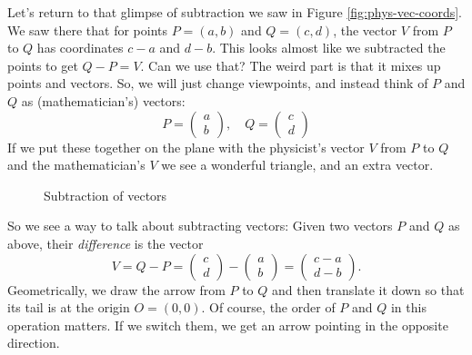 \documentclass[00-livre-main.tex]{subfiles}
\begin{document}
Let's return to that glimpse of subtraction we saw in Figure \ref{fig:phys-vec-coords}.
We saw there that for points $P = (a,b)$ and $Q = (c,d)$, the vector $V$ from $P$ to $Q$ has coordinates $c-a$ and $d-b$. 
This looks almost like we subtracted the points to get $Q-P = V$. 
Can we use that? 
The weird part is that it mixes up points and vectors. 
So, we will just change viewpoints, and instead think of $P$ and $Q$ as (mathematician's) vectors:
\[
P = \begin{pmatrix} a \\ b \end{pmatrix}, \quad Q = \begin{pmatrix} c \\ d \end{pmatrix}
\]
If we put these together on the plane with the physicist's vector $V$ from $P$ to $Q$ and the mathematician's $V$ we see a wonderful triangle, and an extra vector.
\begin{figure}[h]
\centering
{}
\caption{Subtraction of vectors}
\label{fig:subtract-vec}
\end{figure}
So we see a way to talk about subtracting vectors: Given two vectors $P$ and $Q$ as above, their
\emph{difference} is the vector
\[
V = Q-P = \begin{pmatrix} c \\ d \end{pmatrix} - \begin{pmatrix} a \\ b \end{pmatrix} = \begin{pmatrix} c-a \\ d-b \end{pmatrix}.
\]
Geometrically, we draw the arrow from $P$ to $Q$ and then translate it down so that its tail is at the origin $O=(0,0)$. Of course, the order of $P$ and $Q$ in this operation matters. If we switch them, we get an arrow pointing in the opposite direction.
\end{document}
